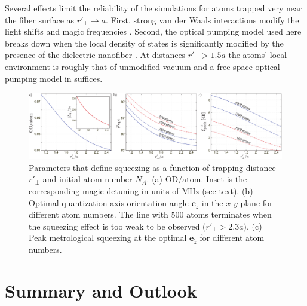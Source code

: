 \documentclass[aps,pra,twocolumn]{revtex4-1} %
\newcommand{\qaxis}{\mathbf{e}_{\tilde{z}}}
\begin{document}
Several effects limit the reliability of the simulations for atoms trapped very near the fiber surface as $r'\!\!_\perp\!\! \rightarrow\! a$. 
First, strong van der Waals interactions modify the light shifts and magic frequencies \cite{vetsch_eugen_optical_2010, lacroute_state-insensitive_2012}.  
Second, the optical pumping model used here breaks down when the local density of states is significantly modified by the presence of the dielectric nanofiber \cite{le_kien_spontaneous_2005, le_kien_scattering_2006}. 
At distances $r'\!\!_\perp \!>\! 1.5a$ the atoms' local environment is roughly that of unmodified vacuum \cite{le_kien_spontaneous_2005} and a free-space optical pumping model in  suffices. 


\begin{figure}[t]\includegraphics[scale=0.4]{./Fig6}
\caption{Parameters that define squeezing as a function of trapping distance $r'_\perp$ and initial atom number $N_A$. (a) OD/atom. Inset is the corresponding magic detuning in units of MHz (see text).
(b) Optimal quantization axis orientation angle $\qaxis$ in the $x$-$y$ plane for different atom numbers. 
The line with $ 500 $ atoms terminates when the squeezing effect is too weak to be observed ($ r'\!_\perp>2.3a $).
(c) Peak metrological squeezing at the optimal $\qaxis$ for different atom numbers.} \label{Fig::Squeezing_Distance}
\end{figure}


\section{Summary and Outlook} \label{Sec::Conclusion}
\end{document}

